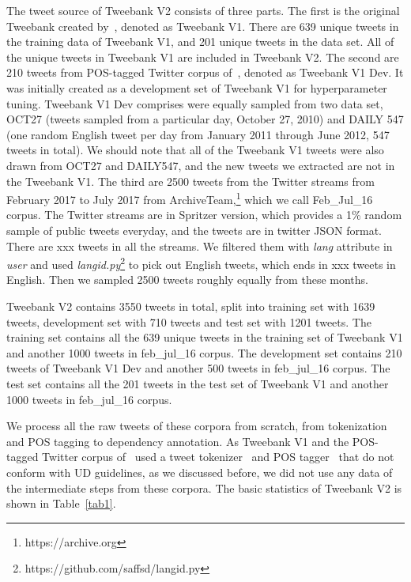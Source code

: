 \documentclass[11pt,letterpaper]{article}
\begin{document}
The tweet source of Tweebank V2 consists of three parts. 
The first is the original Tweebank created by~\cite{kong-EtAl:2014:EMNLP2014}, denoted as Tweebank V1.  There are 639 unique tweets in the training data of Tweebank V1, and 201 unique tweets in the data set. All of the unique tweets in Tweebank V1 are included in Tweebank V2.
The second are 210 tweets from POS-tagged Twitter corpus of~, denoted as Tweebank V1 Dev. It was initially created as a development set of Tweebank V1 for hyperparameter tuning.
Tweebank V1 Dev comprises were equally sampled from two data set, OCT27 (tweets sampled from a particular day, October 27, 2010) and DAILY 547 (one random English tweet per day from January 2011 through June 2012, 547 tweets in total). We should note that all of the Tweebank V1 tweets were also drawn from OCT27 and DAILY547, and the new tweets we extracted are not in the Tweebank V1.
The third are 2500 tweets from the Twitter streams from February 2017 to July 2017 from ArchiveTeam,\footnote{https://archive.org} which we call Feb\_Jul\_16 corpus. The Twitter streams are in Spritzer version, which provides a 1\% random sample of public tweets everyday, and the tweets are in twitter JSON format. 
There are xxx tweets in all the streams. We filtered them with \textit{lang} attribute in \textit{user} and used \textit{langid.py}\footnote{https://github.com/saffsd/langid.py} to pick out English tweets, which ends in xxx tweets in English. Then we sampled 2500 tweets roughly equally from these months.

Tweebank V2 contains 3550 tweets in total, split into training set with 1639 tweets, development set with 710 tweets and test set with 1201 tweets. 
The training set contains all the 639 unique tweets in the training set of Tweebank V1 and another 1000 tweets in feb\_jul\_16 corpus.
The development set contains 210 tweets of Tweebank V1 Dev and another 500 tweets in feb\_jul\_16 corpus.
The test set contains all the 201 tweets in the test set of Tweebank V1 and another 1000 tweets in feb\_jul\_16 corpus.

We process all the raw tweets of these corpora from scratch, from tokenization and POS tagging to dependency annotation. As Tweebank V1 and the POS-tagged Twitter corpus of~ used a tweet tokenizer~\cite{Krieger10tweetmotif:exploratory} and POS tagger~\cite{Gimpel:2011:PTT:2002736.2002747} that do not conform with UD guidelines, as we discussed before, we did not use any data of the intermediate steps from these corpora. The basic statistics of Tweebank V2 is shown in Table~\ref{tab1}.
\end{document}
